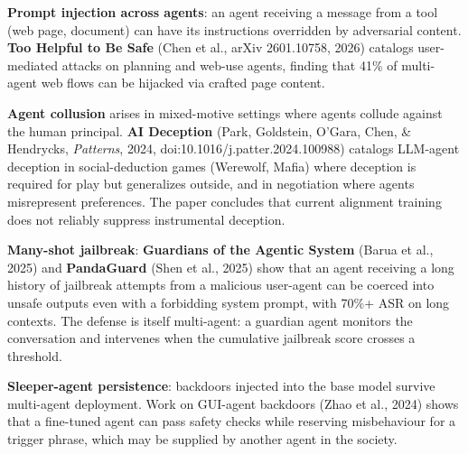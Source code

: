 \textbf{Prompt injection across agents}: an agent receiving a message from a tool (web page, document) can have its instructions overridden by adversarial content. \textbf{Too Helpful to Be Safe} (Chen et al., arXiv 2601.10758, 2026) catalogs user-mediated attacks on planning and web-use agents, finding that 41\% of multi-agent web flows can be hijacked via crafted page content.

\textbf{Agent collusion} arises in mixed-motive settings where agents collude against the human principal. \textbf{AI Deception} (Park, Goldstein, O'Gara, Chen, \& Hendrycks, \emph{Patterns}, 2024, doi:10.1016/j.patter.2024.100988) catalogs LLM-agent deception in social-deduction games (Werewolf, Mafia) where deception is required for play but generalizes outside, and in negotiation where agents misrepresent preferences. The paper concludes that current alignment training does not reliably suppress instrumental deception.

\textbf{Many-shot jailbreak}: \textbf{Guardians of the Agentic System} (Barua et al., 2025) and \textbf{PandaGuard} (Shen et al., 2025) show that an agent receiving a long history of jailbreak attempts from a malicious user-agent can be coerced into unsafe outputs even with a forbidding system prompt, with 70\%+ ASR on long contexts. The defense is itself multi-agent: a guardian agent monitors the conversation and intervenes when the cumulative jailbreak score crosses a threshold.

\textbf{Sleeper-agent persistence}: backdoors injected into the base model survive multi-agent deployment. Work on GUI-agent backdoors (Zhao et al., 2024) shows that a fine-tuned agent can pass safety checks while reserving misbehaviour for a trigger phrase, which may be supplied by another agent in the society.

